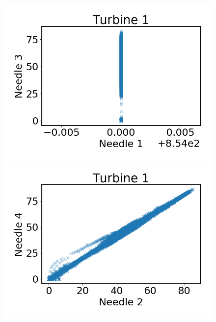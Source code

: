         \begin{figure}
            \begin{minipage}[b]{0.5\linewidth}
                \centering
                \includegraphics[width=\textwidth]{report/figures/data/p2_t1_n1_n3.png}
            \end{minipage}
            \begin{minipage}[b]{0.5\linewidth}
                \centering
                \includegraphics[width=\textwidth]{report/figures/data/p2_t1_n2_n4.png}
            \end{minipage}
            \begin{minipage}[b]{0.5\linewidth}
                \centering

\end{minipage}
\end{figure}
